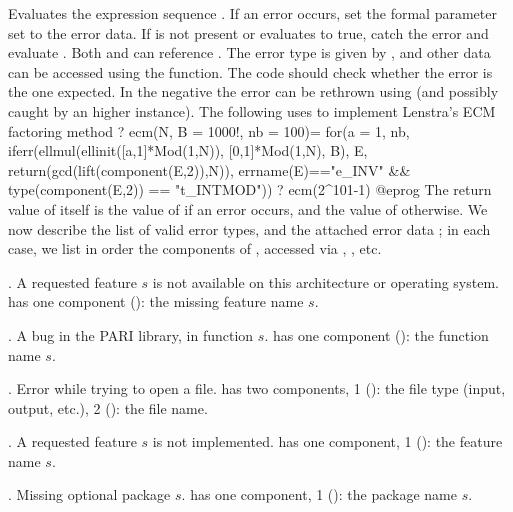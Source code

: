 \label{se:iferr}
Evaluates the expression sequence . If an error occurs,
set the formal parameter  set to the error data.
If  is not present or evaluates to true, catch the error
and evaluate . Both  and  can reference .
The error type is given by , and other data can be
accessed using the  function. The code  should check
whether the error is the one expected. In the negative the error can be
rethrown using  (and possibly caught by an higher 
instance). The following uses  to implement Lenstra's ECM factoring
 method
\bprog
? ecm(N, B = 1000!, nb = 100)=
  {
    for(a = 1, nb,
      iferr(ellmul(ellinit([a,1]*Mod(1,N)), [0,1]*Mod(1,N), B),
        E, return(gcd(lift(component(E,2)),N)),
        errname(E)=="e_INV" && type(component(E,2)) == "t_INTMOD"))
  }
? ecm(2^101-1)
@eprog
The return value of  itself is the value of  if an
error occurs, and the value of  otherwise. We now describe the
list of valid error types, and the attached error data ; in each
case, we list in order the components of , accessed via
, , etc.


 \item {}. A requested feature $s$ is not available on this
 architecture or operating system.
  has one component (): the missing feature name $s$.

 \item {}. A bug in the PARI library, in function $s$.
  has one component (): the function name $s$.

 \item {}. Error while trying to open a file.
  has two components, 1 (): the file type (input, output,
 etc.), 2 (): the file name.

 \item {}. A requested feature $s$ is not implemented.
  has one component, 1 (): the feature name $s$.

 \item {}. Missing optional package $s$.
  has one component, 1 (): the package name $s$.

